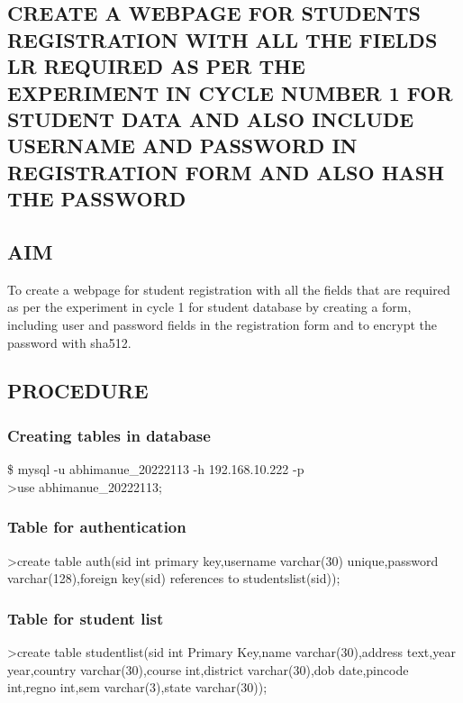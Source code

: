 \documentclass{article}
\begin{document}
\begin{flushleft}
\section{CREATE A WEBPAGE FOR STUDENTS REGISTRATION WITH ALL THE FIELDS LR REQUIRED AS PER THE EXPERIMENT IN CYCLE NUMBER 1 FOR STUDENT DATA AND ALSO INCLUDE USERNAME AND PASSWORD IN REGISTRATION FORM AND ALSO HASH THE PASSWORD}
\hrulefill
\vspace{1cm}
\subsection{AIM}
To create a webpage for student registration with all the fields that are required as per the experiment in cycle 1 for student database by creating a form, including user and password fields in the registration form and to encrypt the password with sha512.
\subsection{PROCEDURE}

\subsubsection{Creating tables in database}
\vspace{0.1in}\hspace{0.3in}\$ mysql -u abhimanue\_20222113 -h 192.168.10.222 -p\\
\vspace{0.1in}\hspace{0.4in}\textgreater use abhimanue\_20222113;\\
\vspace{0.2in}
\subsubsection{Table for authentication}
\vspace{0.2in}
\textgreater create table auth(sid int primary key,username varchar(30) unique,password varchar(128),foreign key(sid) references to studentslist(sid));\\
\vspace{0.2in}
\subsubsection{Table for student list}
\vspace{0.2in}
\textgreater create table studentlist(sid int Primary Key,name varchar(30),address text,year year,country varchar(30),course int,district varchar(30),dob date,pincode int,regno int,sem varchar(3),state varchar(30));

\end{flushleft}
\end{document}
